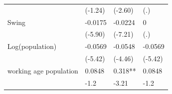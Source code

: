 \documentclass[man]{apa7}
\begin{document}
\begin{table}[htbp]
\begin{tabular}{llll}
                                                        & \multicolumn{1}{p{7.93em}}{(-1.24)} & \multicolumn{1}{p{7.855em}}{(-2.60)}     & \multicolumn{1}{p{7.855em}}{(.)}               \\
    \multicolumn{1}{p{8.355em}}{Swing}                  & -0.0175                             & -0.0224                                  & 0                                              \\
                                                        & \multicolumn{1}{p{7.93em}}{(-5.90)} & \multicolumn{1}{p{7.855em}}{(-7.21)}     & \multicolumn{1}{p{7.855em}}{(.)}               \\
    \multicolumn{1}{p{8.355em}}{Log(population)}        & -0.0569                             & -0.0548                                  & -0.0569                                        \\
                                                        & \multicolumn{1}{p{7.93em}}{(-5.42)} & \multicolumn{1}{p{7.855em}}{(-4.46)}     & \multicolumn{1}{p{7.855em}}{(-5.42)}           \\
    \multicolumn{1}{p{8.355em}}{working age population} & 0.0848                              & \multicolumn{1}{p{7.855em}}{0.318**}     & 0.0848                                         \\
                                                        & -1.2                                & -3.21                                    & -1.2                                           \\
    \bottomrule
  \end{tabular}%
  \label{Table 2.8}%
\end{table}%
\end{document}
